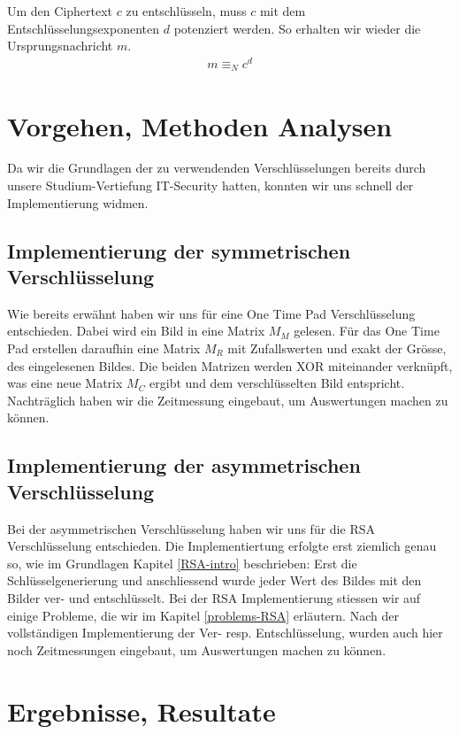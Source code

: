 \documentclass[paper=a4,fontsize=12pt]{scrartcl}
\begin{document}
Um den Ciphertext $c$ zu entschlüsseln, muss $c$ mit dem Entschlüsselungsexponenten $d$ potenziert werden.
So erhalten wir wieder die Ursprungsnachricht $m$.
\begin{align}
	m \equiv_N c^d
\end{align}

 

\newpage
\section{Vorgehen, Methoden Analysen}
Da wir die Grundlagen der zu verwendenden Verschlüsselungen bereits durch unsere Studium-Vertiefung IT-Security hatten,
konnten wir uns schnell der Implementierung widmen.

\subsection{Implementierung der symmetrischen Verschlüsselung}
Wie bereits erwähnt haben wir uns für eine One Time Pad Verschlüsselung entschieden.
Dabei wird ein Bild in eine Matrix $M_M$ gelesen. 
Für das One Time Pad erstellen daraufhin eine Matrix $M_R$ mit Zufallswerten und exakt der Grösse, des eingelesenen Bildes.
Die beiden Matrizen werden XOR miteinander verknüpft, was eine neue Matrix $M_C$ ergibt und dem verschlüsselten Bild entspricht.
Nachträglich haben wir die Zeitmessung eingebaut, um Auswertungen machen zu können.


\subsection{Implementierung der asymmetrischen Verschlüsselung}
Bei der asymmetrischen Verschlüsselung haben wir uns für die RSA Verschlüsselung entschieden.
Die Implementiertung erfolgte erst ziemlich genau so, wie im Grundlagen Kapitel \ref{RSA-intro} beschrieben:
Erst die Schlüsselgenerierung und anschliessend wurde jeder Wert des Bildes mit den Bilder ver- und entschlüsselt.
Bei der RSA Implementierung stiessen wir auf einige Probleme, die wir im Kapitel \ref{problems-RSA} erläutern.
Nach der vollständigen Implementierung der Ver- resp. Entschlüsselung, wurden auch hier noch Zeitmessungen eingebaut, um Auswertungen
machen zu können.

\newpage
\section{Ergebnisse, Resultate} \label{results} 
\end{document}
